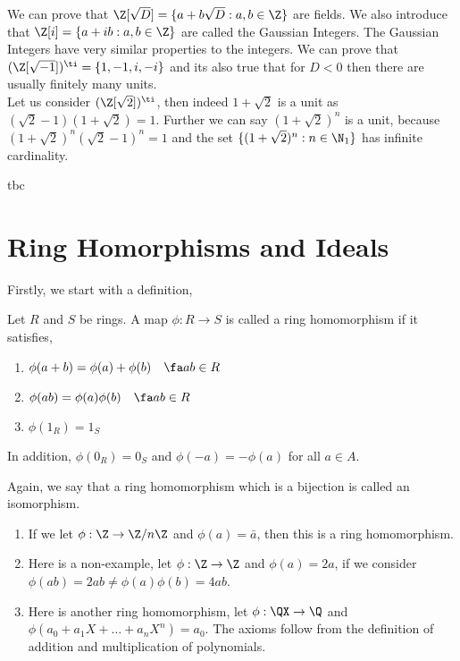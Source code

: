 We can prove that $\Z[\sqrt D] = \{a + b\sqrt D : a,b \in \Z\}$ are fields. We also introduce that $\Z[i] = \{a + ib : a, b \in \Z\}$ are called the Gaussian Integers. The Gaussian Integers have very similar properties to the integers. We can prove that $(\Z[\sqrt{-1}])^\ti = \{1, -1, i, -i\}$ and its also true that for $D < 0$ then there are usually finitely many units.\\

Let us consider $(\Z[\sqrt 2])^\ti$, then indeed $1 + \sqrt 2$ is a unit as $(\sqrt 2 - 1)(1 + \sqrt 2) = 1$. Further we can say $(1 + \sqrt 2)^n$ is a unit, because $(1 + \sqrt 2)^n(\sqrt 2 - 1)^n = 1$ and the set $\{(1 + \sqrt 2)^n : n \in \N_1 \}$ has infinite cardinality.

\begin{nthm}
  tbc
\end{nthm}

\section{Ring Homorphisms and Ideals}
Firstly, we start with a definition,
\begin{ndefi}
  Let $R$ and $S$ be rings. A map $\phi : R \to S$ is called a ring homomorphism if it satisfies,
  \begin{enumerate}
    \item $\phi(a + b) = \phi(a) + \phi(b)\quad\fa a b \in R$
    \item $\phi(ab) = \phi(a)\phi(b)\quad\fa a b \in R$
    \item $\phi(1_R) = 1_S$
  \end{enumerate}
  In addition, $\phi(0_R) = 0_S$ and $\phi(-a) = -\phi(a)$ for all $a \in A$.
\end{ndefi}

Again, we say that a ring homomorphism which is a bijection is called an isomorphism.

\begin{eg}
  \begin{enumerate}
    \item If we let $\phi : \Z \to \Z/n\Z$ and $\phi(a) = \bar a$, then this is a ring homomorphism.
    \item Here is a non-example, let $\phi : \Z \to \Z$ and $\phi(a) = 2a$, if we consider $\phi(ab) = 2ab \ne \phi(a)\phi(b) = 4ab$.
    \item Here is another ring homomorphism, let $\phi : \QX \to \Q$ and $\phi(a_0 + a_1X + \dots + a_nX^n) = a_0$. The axioms follow from the definition of addition and multiplication of polynomials.
  \end{enumerate}
\end{eg}

